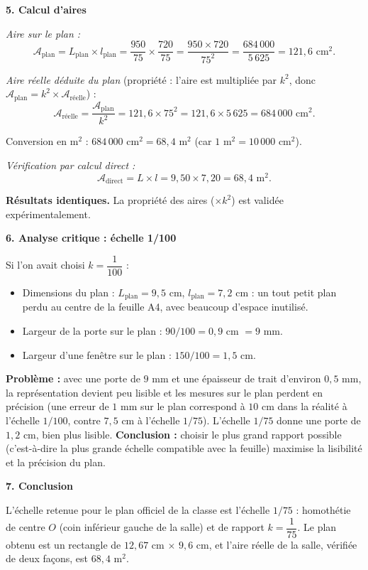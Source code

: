 \documentclass[11pt]{article}
\begin{document}
\begin{exoresolu}
\textbf{5. Calcul d'aires}
\par \emph{Aire sur le plan :}
\[
\mathcal{A}_{\text{plan}} = L_{\text{plan}} \times l_{\text{plan}} = \frac{950}{75} \times \frac{720}{75} = \frac{950 \times 720}{75^2} = \frac{684\,000}{5\,625} = 121,6 \text{ cm}^2.
\]
\par \emph{Aire réelle déduite du plan} (propriété : l'aire est multipliée par $k^2$, donc $\mathcal{A}_{\text{plan}} = k^2 \times \mathcal{A}_{\text{réelle}}$) :
\[
\mathcal{A}_{\text{réelle}} = \frac{\mathcal{A}_{\text{plan}}}{k^2} = 121,6 \times 75^2 = 121,6 \times 5\,625 = 684\,000 \text{ cm}^2.
\]
\par Conversion en m$^2$ : $684\,000 \text{ cm}^2 = 68,4 \text{ m}^2$ (car $1 \text{ m}^2 = 10\,000 \text{ cm}^2$).
\par \emph{Vérification par calcul direct :}
\[
\mathcal{A}_{\text{direct}} = L \times l = 9,50 \times 7,20 = 68,4 \text{ m}^2.
\]
\par \textbf{Résultats identiques.} La propriété des aires ($\times k^2$) est validée expérimentalement.

\textbf{6. Analyse critique : échelle 1/100}
\par Si l'on avait choisi $k = \dfrac{1}{100}$ :
\begin{itemize}
    \item Dimensions du plan : $L_{\text{plan}} = 9,5$ cm, $l_{\text{plan}} = 7,2$ cm : un tout petit plan perdu au centre de la feuille A4, avec beaucoup d'espace inutilisé.
    \item Largeur de la porte sur le plan : $90 / 100 = 0,9$ cm $= 9$ mm.
    \item Largeur d'une fenêtre sur le plan : $150 / 100 = 1,5$ cm.
\end{itemize}
\par \textbf{Problème :} avec une porte de $9$ mm et une épaisseur de trait d'environ $0,5$ mm, la représentation devient peu lisible et les mesures sur le plan perdent en précision (une erreur de $1$ mm sur le plan correspond à $10$ cm dans la réalité à l'échelle $1/100$, contre $7,5$ cm à l'échelle $1/75$). L'échelle $1/75$ donne une porte de $1,2$ cm, bien plus lisible. \textbf{Conclusion :} choisir le plus grand rapport possible (c'est-à-dire la plus grande échelle compatible avec la feuille) maximise la lisibilité et la précision du plan.

\textbf{7. Conclusion}
\par L'échelle retenue pour le plan officiel de la classe est l'échelle $1/75$ : homothétie de centre $O$ (coin inférieur gauche de la salle) et de rapport $k = \dfrac{1}{75}$. Le plan obtenu est un rectangle de $12,67$ cm $\times$ $9,6$ cm, et l'aire réelle de la salle, vérifiée de deux façons, est $68,4 \text{ m}^2$.
\end{exoresolu}
\end{document}
